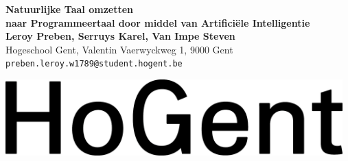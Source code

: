 \documentclass[a0,portrait]{a0poster}
\begin{document}


\begin{minipage}[t]{0.75\linewidth}
\VeryHuge \color{HoGentAccent1} \textbf{Natuurlijke Taal omzetten \\naar Programmeertaal door middel van Artifici\"ele Intelligentie} \color{Black}\\ %
\huge \textbf{Leroy Preben, Serruys Karel, Van Impe Steven}\\[0.5cm] %
\huge Hogeschool Gent, Valentin Vaerwyckweg 1, 9000 Gent\\[0.4cm] %
\Large \texttt{preben.leroy.w1789@student.hogent.be} \\
\end{minipage}
%
\begin{minipage}[t]{0.25\linewidth}
\includegraphics[width=13cm,right]{figures/HG-woordmerk.jpg} 

\end{minipage}

\vspace{1cm} %

\end{document}
